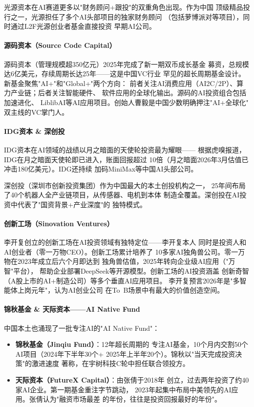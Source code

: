 光源资本在AI赛道更多以"财务顾问+跟投"的双重角色出现。作为中国
顶级精品投行之一，光源担任了多个AI头部项目的独家财务顾问
（包括萝博派对等项目），同时通过L2F光源创业者基金直接投资
早期AI公司。

\paragraph{源码资本（Source Code Capital）}

源码资本（管理规模超350亿元）2025年完成了新一期双币成长基金
募资，总规模达6亿美元，存续周期长达25年——这是中国VC行业
罕见的超长周期基金设计。新基金聚焦"AI+"和"Global+"两个方向：
前者关注AI消费应用（AI2C/2P）、算力产业链；后者关注智能硬件、
软件应用的全球化输出。源码的AI投资组合包括加速进化、
LiblibAI等AI应用项目。创始人曹毅是中国少数明确押注"AI+全球化"
双主线的VC掌门人。

\paragraph{IDG资本 \& 深创投}

IDG资本在AI领域的战绩以月之暗面的天使轮投资最为耀眼——
根据虎嗅报道，IDG在月之暗面天使轮即已进入，账面回报超过
10倍（月之暗面2026年3月估值已冲击180亿美元）。IDG还持续
加码MiniMax等中国AI头部公司。

深创投（深圳市创新投资集团）作为中国最大的本土创投机构之一，
25年间布局了40个机器人全产业链项目，从传感器、电机到本体
制造全覆盖。深创投在AI投资中代表了"国资背景+产业深度"的
独特模式。

\paragraph{创新工场（Sinovation Ventures）}

李开复创立的创新工场在AI投资领域有独特定位——李开复本人
同时是投资人和AI创业者（零一万物CEO）。创新工场累计培养了
10多家AI独角兽公司。零一万物在2023年成立后六个月即达到
独角兽估值，2025年转向企业级AI应用（"万智"平台），
帮助企业部署DeepSeek等开源模型。创新工场的AI投资涵盖
创新奇智（A股上市的AI+制造公司）等多个垂直AI应用项目。
李开复预言2026年是"多智能体上岗元年"，认为AI创业公司
在To~B场景中有最大的价值创造空间。

\paragraph{锦秋基金 \& 天际资本——AI Native Fund}

中国本土也涌现了一批专注AI的"AI Native Fund"：
\begin{itemize}
  \item \textbf{锦秋基金（Jinqiu Fund）}：12年超长周期的
    专注AI基金，10个月内交割50个AI项目（2024年下半年30个+
    2025年上半年20个）。锦秋以"当天完成投资决策"的激进速度
    著称，在宇树科技C轮中担任联合领投方。
  \item \textbf{天际资本（FutureX Capital）}：由张倩于2018年
    创立，过去两年投资了约40家AI企业。第一期基金重注字节跳动，
    2023年起集中布局中美领先的AI应用。张倩认为"融资市场最差
    的年份，往往是投资回报最好的年份"。
\end{itemize}

